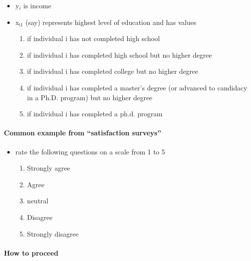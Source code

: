\begin{itemize}
\item y$_i$ is income
\item x$_{\mathrm{i1}}$ (say) represents highest level of education and has
          values
\begin{enumerate}
\item if individual i has not completed high school
\item if individual i has completed high school but no higher
             degree
\item if individual i has completed college but no higher
             degree
\item if individual i has completed a master's degree (or
             advanced to candidacy in a Ph.D. program) but no higher
             degree
\item if individual i has completed a ph.d. program
\end{enumerate}
\end{itemize}
\paragraph{Common example from ``satisfaction surveys''}
\label{sec-1-2-3}

\begin{itemize}
\item rate the following questions on a scale from 1 to 5
\begin{enumerate}
\item Strongly agree
\item Agree
\item neutral
\item Disagree
\item Strongly disagree
\end{enumerate}
\end{itemize}
\paragraph{How to proceed}
\label{sec-1-2-4}

